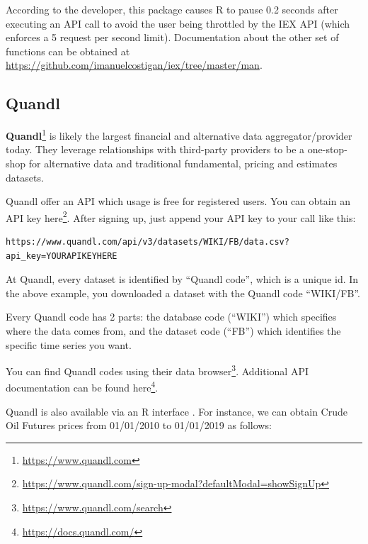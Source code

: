 \documentclass[]{book}
\newenvironment{Shaded}{\begin{snugshade}}{\end{snugshade}}
\newcommand{\KeywordTok}[1]{\textcolor[rgb]{0.13,0.29,0.53}{\textbf{#1}}}
\newcommand{\DataTypeTok}[1]{\textcolor[rgb]{0.13,0.29,0.53}{#1}}
\newcommand{\StringTok}[1]{\textcolor[rgb]{0.31,0.60,0.02}{#1}}
\newcommand{\OperatorTok}[1]{\textcolor[rgb]{0.81,0.36,0.00}{\textbf{#1}}}
\newcommand{\NormalTok}[1]{#1}
\DeclareRobustCommand{\href}[2]{#2\footnote{\url{#1}}}
\theoremstyle{definition}
\theoremstyle{definition}
\theoremstyle{definition}
\theoremstyle{remark}
\begin{document}
According to the developer, this package causes R to pause 0.2 seconds
after executing an API call to avoid the user being throttled by the IEX
API (which enforces a 5 request per second limit). Documentation about
the other set of functions can be obtained at
\url{https://github.com/imanuelcostigan/iex/tree/master/man}.

\subsection{Quandl}\label{quandl}

\href{https://www.quandl.com}{\textbf{Quandl}} is likely the largest
financial and alternative data aggregator/provider today. They leverage
relationships with third-party providers to be a one-stop-shop for
alternative data and traditional fundamental, pricing and estimates
datasets.

Quandl offer an API which usage is free for registered users. You can
obtain an API key
\href{https://www.quandl.com/sign-up-modal?defaultModal=showSignUp}{here}.
After signing up, just append your API key to your call like this:

\begin{verbatim}
https://www.quandl.com/api/v3/datasets/WIKI/FB/data.csv?api_key=YOURAPIKEYHERE
\end{verbatim}

At Quandl, every dataset is identified by ``Quandl code'', which is a
unique id. In the above example, you downloaded a dataset with the
Quandl code ``WIKI/FB''.

Every Quandl code has 2 parts: the database code (``WIKI'') which
specifies where the data comes from, and the dataset code (``FB'') which
identifies the specific time series you want.

You can find Quandl codes using their
\href{https://www.quandl.com/search}{data browser}. Additional API
documentation can be found \href{https://docs.quandl.com/}{here}.

Quandl is also available via an R interface \citep{R-Quandl}. For
instance, we can obtain Crude Oil Futures prices from 01/01/2010 to
01/01/2019 as follows:

\begin{Shaded}
\end{Shaded}
\end{document}
